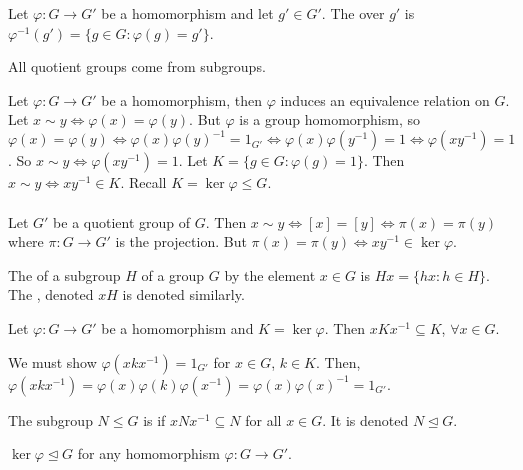 \documentclass{mathnotes}
\begin{document}
\begin{defi}
  Let $\varphi:G\to G'$ be a homomorphism and let $g'\in G'$. The
   over $g'$ is $\varphi^{-1}(g')=\{g\in G:\varphi(g)=g'\}$.
\end{defi}

\begin{bprop}
  All quotient groups come from subgroups.
\end{bprop}

\begin{bpf}
  Let $\varphi:G\to G'$ be a homomorphism, then $\varphi$ induces an
  equivalence relation on $G$. Let $x\sim
  y\Leftrightarrow\varphi(x)=\varphi(y)$. But $\varphi$ is a group
  homomorphism, so
  $\varphi(x)=\varphi(y)\Leftrightarrow\varphi(x)\varphi(y)^{-1}
  =1_{G'}\Leftrightarrow\varphi(x)\varphi(y^{-1})=1\Leftrightarrow
  \varphi(xy^{-1})=1$. So $x\sim y\Leftrightarrow\varphi(xy^{-1})=1$. Let
  $K=\{g\in G:\varphi(g)=1\}$. Then $x\sim y\Leftrightarrow xy^{-1}\in K$.
  Recall $K=\ker\varphi\le G$.\\\\
  Let $G'$ be a quotient group of $G$. Then $x\sim
  y\Leftrightarrow[x]=[y]\Leftrightarrow\pi(x)=\pi(y)$ where $\pi:G\to G'$ is
  the projection. But $\pi(x)=\pi(y)\Leftrightarrow xy^{-1}\in\ker\varphi$.
\end{bpf}

\begin{defi}
  The  of a subgroup $H$ of a group $G$ by the element
  $x\in G$ is $Hx=\{hx:h\in H\}$. The , denoted $xH$ is
  denoted similarly.
\end{defi}

\begin{prop}
  Let $\varphi:G\to G'$ be a homomorphism and $K=\ker\varphi$. Then
  $xKx^{-1}\subseteq K$, $\forall x\in G$.
\end{prop}

\begin{pf}
  We must show $\varphi(xkx^{-1})=1_{G'}$ for $x\in G$, $k\in K$. Then,
  $\varphi(xkx^{-1})=\varphi(x)\varphi(k)\varphi(x^{-1})
  =\varphi(x)\varphi(x)^{-1}=1_{G'}$.
\end{pf}

\begin{bdefi}
  The subgroup $N\le G$ is  if $xNx^{-1}\subseteq N$ for all
  $x\in G$. It is denoted $N\unlhd G$.
\end{bdefi}

\begin{prop}
  $\ker\varphi\unlhd G$ for any homomorphism $\varphi:G\to G'$.
\end{prop}
\end{document}
